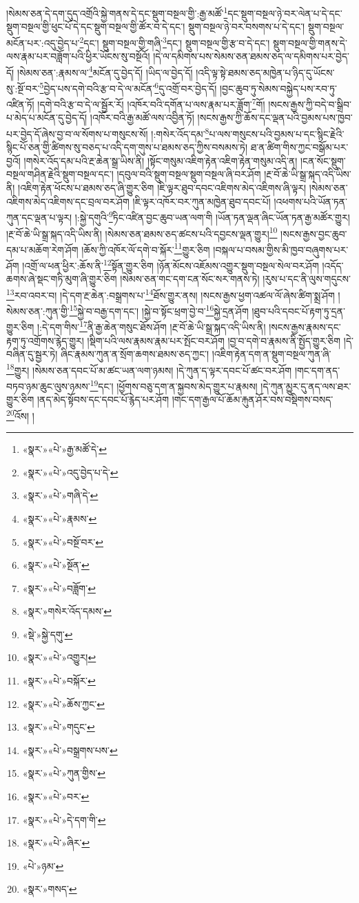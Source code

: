 །སེམས་ཅན་དེ་དག་དུད་འགྲོའི་སྐྱེ་གནས་དེ་དང་སྡུག་བསྔལ་གྱི་:རྒྱ་མཚོ་\footnote{«སྣར་»«པེ་»རྒྱ་མཚོ་དེ་}དང་སྡུག་བསྔལ་ཉེ་བར་ལེན་པ་དེ་དང་སྡུག་བསྔལ་གྱི་ཕུང་པོ་དེ་དང་སྡུག་བསྔལ་གྱི་ཚོར་བ་དེ་དང་། སྡུག་བསྔལ་ཉེ་བར་བསགས་པ་དེ་དང་། སྡུག་བསྔལ་མངོན་པར་:འདུ་བྱེད་པ་\footnote{«སྣར་»«པེ་»འདུ་བྱེད་པ་དེ་}དང་། སྡུག་བསྔལ་གྱི་གཞི་\footnote{«སྣར་»«པེ་»གཞི་དེ་}དང་། སྡུག་བསྔལ་གྱི་རྩ་བ་དེ་དང་། སྡུག་བསྔལ་གྱི་གནས་དེ་ལས་རྣམ་པར་བཟློག་པའི་ཕྱིར་ཡོངས་སུ་བསྔོའོ། །དེ་ལ་དམིགས་པས་སེམས་ཅན་ཐམས་ཅད་ལ་དམིགས་པར་བྱེད་དོ། །སེམས་ཅན་:རྣམས་ལ་\footnote{«སྣར་»«པེ་»རྣམས་}མངོན་དུ་བྱེད་དོ། །ཡིད་ལ་བྱེད་དོ། །འདི་ལྟ་སྟེ་ཐམས་ཅད་མཁྱེན་པ་ཉིད་དུ་ཡོངས་སུ་:སྔོ་བར་\footnote{«སྣར་»«པེ་»བསྔོ་བར་}བྱེད་པས་དགེ་བའི་རྩ་བ་དེ་ལ་མངོན་\footnote{«སྣར་»«པེ་»སྔོན་}དུ་འགྲོ་བར་བྱེད་དོ། །བྱང་ཆུབ་ཏུ་སེམས་བསྐྱེད་པས་རབ་ཏུ་འཛིན་ཏོ། །དགེ་བའི་རྩ་བ་དེ་ལ་སྦྱོར་རོ། །འཁོར་བའི་དགོན་པ་ལས་རྣམ་པར་ཟློག་\footnote{«སྣར་»«པེ་»བཟློག་}གོ། །སངས་རྒྱས་ཀྱི་བདེ་བ་སྒྲིབ་པ་མེད་པ་མངོན་དུ་བྱེད་དོ། །འཁོར་བའི་རྒྱ་མཚོ་ལས་འབྱིན་ཏོ། །སངས་རྒྱས་ཀྱི་ཆོས་དང་ལྡན་པའི་བྱམས་པས་ཁྱབ་པར་བྱེད་དོ་ཞེས་བྱ་བ་ལ་སོགས་པ་གསུངས་སོ། །:གསེར་འོད་དམ་\footnote{«སྣར་»གསེར་འོད་དམས་}པ་ལས་གསུངས་པའི་བྱམས་པ་དང་སྙིང་རྗེའི་སྙིང་པོ་ཅན་གྱི་ཚིགས་སུ་བཅད་པ་འདི་དག་གུས་པ་ཐམས་ཅད་ཀྱིས་བསམས་ཏེ། ཐ་ན་ཚིག་གིས་ཀྱང་བསྒོམ་པར་བྱའོ། །གསེར་འོད་དམ་པའི་རྔ་ཆེན་སྒྲ་ཡིས་ནི། །སྟོང་གསུམ་འཇིག་རྟེན་འཇིག་རྟེན་གསུམ་འདི་ན། །ངན་སོང་སྡུག་བསྔལ་གཤིན་རྗེའི་སྡུག་བསྔལ་དང་། །དབུལ་བའི་སྡུག་བསྔལ་སྡུག་བསྔལ་ཞི་བར་ཤོག །རྔ་བོ་ཆེ་ཡི་སྒྲ་སྐད་འདི་ཡིས་ནི། །འཇིག་རྟེན་ཕོངས་པ་ཐམས་ཅད་ཞི་གྱུར་ཅིག །ཇི་ལྟར་ཐུབ་དབང་འཇིགས་མེད་འཇིགས་ཞི་ལྟར། །སེམས་ཅན་འཇིགས་མེད་འཇིགས་དང་བྲལ་བར་ཤོག །ཇི་ལྟར་འཁོར་བར་ཀུན་མཁྱེན་ཐུབ་དབང་པོ། །འཕགས་པའི་ཡོན་ཏན་ཀུན་དང་ལྡན་པ་ལྟར། །:སྐྱེ་དགུའི་\footnote{«སྡེ་»སྐྱེ་དགུ་}ཏིང་འཛིན་བྱང་ཆུབ་ཡན་ལག་གི །ཡོན་ཏན་ལྡན་ཞིང་ཡོན་ཏན་རྒྱ་མཚོར་གྱུར། །རྔ་བོ་ཆེ་ཡི་སྒྲ་སྐད་འདི་ཡིས་ནི། །སེམས་ཅན་ཐམས་ཅད་ཚངས་པའི་དབྱངས་ལྡན་གྱུར།\footnote{«སྣར་»«པེ་»འགྱུར།} །སངས་རྒྱས་བྱང་ཆུབ་དམ་པ་མཆོག་རེག་ཤོག །ཆོས་ཀྱི་འཁོར་ལོ་དགེ་བ་སྐོར་\footnote{«སྣར་»«པེ་»བསྐོར་}གྱུར་ཅིག །བསྐལ་པ་བསམ་གྱིས་མི་ཁྱབ་བཞུགས་པར་ཤོག །འགྲོ་ལ་ཕན་ཕྱིར་:ཆོས་ནི་\footnote{«སྣར་»«པེ་»ཆོས་ཀྱང་}སྟོན་གྱུར་ཅིག །ཉོན་མོངས་འཇོམས་འགྱུར་སྡུག་བསྔལ་སེལ་བར་ཤོག །འདོད་ཆགས་ཞེ་སྡང་གཏི་མུག་ཞི་གྱུར་ཅིག །སེམས་ཅན་གང་དག་ངན་སོང་སར་གནས་ཏེ། །རུས་པ་དང་ནི་ལུས་གདུངས་\footnote{«སྣར་»«པེ་»གདུང་}རབ་འབར་བ། །དེ་དག་རྔ་ཆེན་:བསྒྲགས་པ་\footnote{«སྣར་»«པེ་»བསྒྲགས་པས་}ཐོས་གྱུར་ནས། །སངས་རྒྱས་ཕྱག་འཚལ་ལོ་ཞེས་ཚིག་སྨྲ་ཤོག །སེམས་ཅན་:ཀུན་གྱི་\footnote{«སྣར་»«པེ་»ཀུན་གྱིས་}སྐྱེ་བ་བརྒྱ་དག་དང་། །སྐྱེ་བ་སྟོང་ཕྲག་བྱེ་བ་\footnote{«སྣར་»«པེ་»བར་}སྐྱེ་དྲན་ཤོག །ཐུབ་པའི་དབང་པོ་རྟག་ཏུ་དྲན་གྱུར་ཅིག །:དེ་དག་གིས་\footnote{«སྣར་»«པེ་»དེ་དག་གི་}ནི་རྒྱ་ཆེན་གསུང་ཐོས་ཤོག །རྔ་བོ་ཆེ་ཡི་སྒྲ་སྐད་འདི་ཡིས་ནི། །སངས་རྒྱས་རྣམས་དང་རྟག་ཏུ་འགྲོགས་རྙེད་གྱུར། །སྡིག་པའི་ལས་རྣམས་རྣམ་པར་སྤོང་བར་ཤོག །བྱ་བ་དགེ་བ་རྣམས་ནི་སྤྱོད་གྱུར་ཅིག །དེ་བཞིན་དུ་སྦྱར་ཏེ། ཞིང་རྣམས་ཀུན་ན་སྲོག་ཆགས་ཐམས་ཅད་ཀྱང་། །འཇིག་རྟེན་དག་ན་སྡུག་བསྔལ་ཀུན་ཞི་\footnote{«སྣར་»«པེ་»ཞིར་}གྱུར། །སེམས་ཅན་དབང་པོ་མ་ཚང་ཡན་ལག་ཉམས། །དེ་ཀུན་ད་ལྟར་དབང་པོ་ཚང་བར་ཤོག །གང་དག་ནད་བཏབ་ཉམ་ཆུང་ལུས་ཉམས་\footnote{«པེ་»ཉམ་}དང་། །ཕྱོགས་བཅུ་དག་ན་སྐྱབས་མེད་གྱུར་པ་རྣམས། །དེ་ཀུན་མྱུར་དུ་ནད་ལས་ཐར་གྱུར་ཅིག །ནད་མེད་སྟོབས་དང་དབང་པོ་རྙེད་པར་ཤོག །གང་དག་རྒྱལ་པོ་ཆོམ་རྐུན་ཤོར་བས་བསྡིགས་བསད་\footnote{«སྣར་»གསད་}འོས། །
